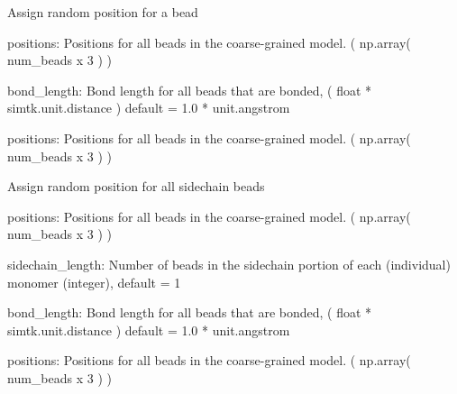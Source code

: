 \documentclass[letterpaper,10pt,english]{sphinxmanual}
\begin{document}

\begin{fulllineitems}
\label{\detokenize{index:utilities.util.assign_position}}
Assign random position for a bead

positions: Positions for all beads in the coarse-grained model.
( np.array( num\_beads x 3 ) )

bond\_length: Bond length for all beads that are bonded,
( float * simtk.unit.distance )
default = 1.0 * unit.angstrom

positions: Positions for all beads in the coarse-grained model.
( np.array( num\_beads x 3 ) )

\end{fulllineitems}


\begin{fulllineitems}
\label{\detokenize{index:utilities.util.assign_sidechain_beads}}
Assign random position for all sidechain beads

positions: Positions for all beads in the coarse-grained model.
( np.array( num\_beads x 3 ) )

sidechain\_length: Number of beads in the sidechain
portion of each (individual) monomer (integer), default = 1

bond\_length: Bond length for all beads that are bonded,
( float * simtk.unit.distance )
default = 1.0 * unit.angstrom

positions: Positions for all beads in the coarse-grained model.
( np.array( num\_beads x 3 ) )

\end{fulllineitems}

\end{document}
